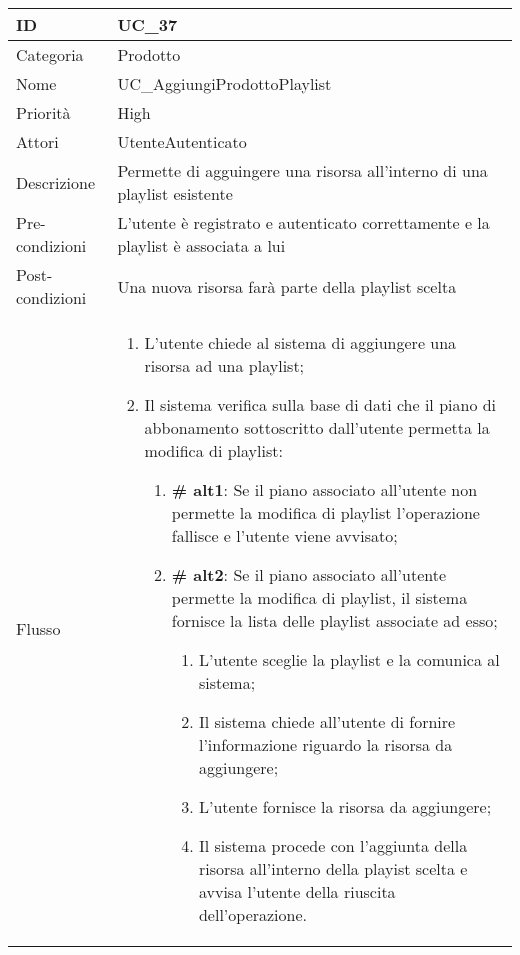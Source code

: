 \begin{center}
\begin{tabular}{ |p{2cm}|p{13cm}|  }
\hline
ID & UC\_37 \\\hline
Categoria & Prodotto \\\hline
Nome & UC\_AggiungiProdottoPlaylist\\\hline
Priorità & High \\\hline
Attori &  UtenteAutenticato \\\hline
Descrizione & Permette di agguingere una risorsa all'interno di una playlist esistente\\\hline
Pre-condizioni & L'utente è registrato e autenticato correttamente e la playlist è associata a lui\\\hline
Post-condizioni & Una nuova risorsa farà parte della playlist scelta\\\hline
Flusso &  	\begin{enumerate}
		\item L'utente chiede al sistema di aggiungere una risorsa ad una playlist;
		\item Il sistema verifica sulla base di dati che il piano di abbonamento sottoscritto dall'utente permetta la modifica di playlist:
		 \begin{enumerate}[label*=\arabic*.]
			\item \textbf{\# alt1}: Se il piano associato all'utente non permette la modifica di playlist l'operazione fallisce e l'utente viene avvisato;
			\item \textbf{\# alt2}: Se il piano associato all'utente permette la modifica di playlist, il sistema  fornisce la lista delle playlist associate ad esso;
			\begin{enumerate}[label*=\arabic*.]
				\item L'utente sceglie la playlist e la comunica al sistema;	
				\item Il sistema chiede all'utente di fornire l'informazione riguardo la risorsa da aggiungere;
				\item L'utente fornisce la risorsa da aggiungere;
				\item Il sistema procede con l'aggiunta della risorsa all'interno della playist scelta e avvisa l'utente della riuscita dell'operazione.
			\end{enumerate}
		\end{enumerate}
		\end{enumerate}\\\hline
\end{tabular}
\label{table_use_case:37}\newline


\end{center}
